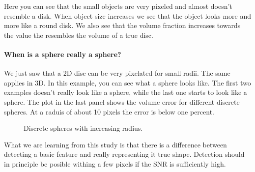 \documentclass[letterpaper,10pt,english]{sphinxmanual}
\begin{document}
\begin{sphinxVerbatim}[commandchars=\\\{\}]
     
                    
\end{sphinxVerbatim}

\noindent{}

\sphinxAtStartPar
Here you can see that the small objects are very pixeled and almost doesn’t resemble a disk. When object size increases we see that the object looks more and more like a round disk. We also see that the volume fraction increases towards the value the resembles the volume of a true disc.


\paragraph{When is a sphere really a sphere?}
\label{\detokenize{04-BasicSegmentation_Part2:when-is-a-sphere-really-a-sphere}}
\sphinxAtStartPar
We just saw that a 2D disc can be very pixelated for small radii. The same applies in 3D. In this example, you can see what a sphere looks like. The first two examples doesn’t really look like a sphere, while the last one starts to look like a sphere. The plot in the last panel shows the volume error for different discrete spheres. At a raduis of about 10 pixels the error is below one percent.

\begin{figure}[htbp]
\centering
\capstart

\noindent{}
\caption{Discrete spheres with increasing radius.}\label{\detokenize{04-BasicSegmentation_Part2:id5}}\end{figure}



\sphinxAtStartPar
What we are learning from this study is that there is a difference between detecting a basic feature and really representing it true shape. Detection should in principle be posible withing a few pixels if the SNR is sufficiently high.
\end{document}
